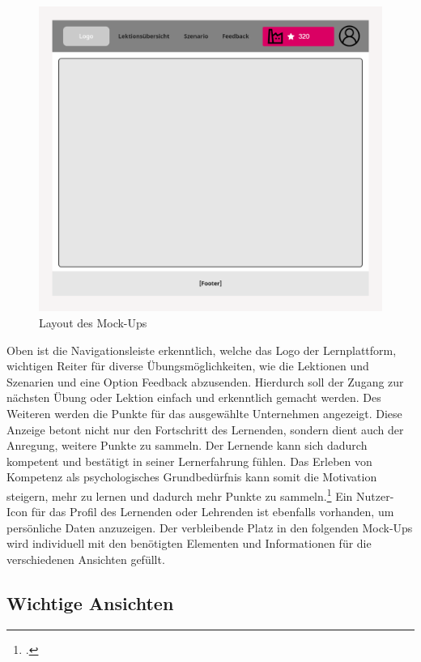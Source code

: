 \begin{figure}
    \centering
    \includegraphics[width=1.0\textwidth]{assets/screenshots/mockups/Layout-MockUp.png}
    \caption{Layout des Mock-Ups}
    \label{fig:Layout Mock-Up}
\end{figure}

Oben ist die Navigationsleiste erkenntlich, welche das Logo der Lernplattform, wichtigen Reiter für diverse Übungsmöglichkeiten, wie die Lektionen und Szenarien und eine Option Feedback abzusenden. Hierdurch soll der Zugang zur nächsten Übung oder Lektion einfach und erkenntlich gemacht werden.
Des Weiteren werden die Punkte für das ausgewählte Unternehmen angezeigt. Diese Anzeige betont nicht nur den Fortschritt des Lernenden, sondern dient auch der Anregung, weitere Punkte zu sammeln. Der Lernende kann sich dadurch kompetent und bestätigt in seiner Lernerfahrung fühlen. Das Erleben von Kompetenz als psychologisches Grundbedürfnis kann somit die Motivation steigern, mehr zu lernen und dadurch mehr Punkte zu sammeln.\footcite[vgl.][S.516-517]{BolognaDigital}
Ein Nutzer-Icon für das Profil des Lernenden oder Lehrenden ist ebenfalls vorhanden, um persönliche Daten anzuzeigen. 
Der verbleibende Platz in den folgenden Mock-Ups wird individuell mit den benötigten Elementen und Informationen für die verschiedenen Ansichten gefüllt.

\subsection{Wichtige Ansichten}

